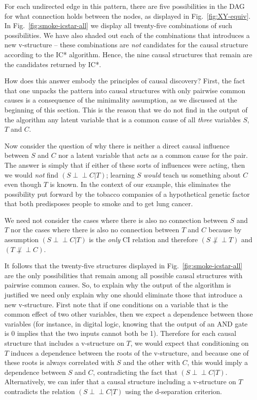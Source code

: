 \documentclass[letterpaper,onecolumn,nofootinbib]{revtex4}
\def\indep{\perp\!\!\!\!\perp}
\begin{document}
For each undirected edge in this pattern, there are five possibilities in the DAG for what connection holds between the nodes, as displayed in Fig.~\ref{fig:XY-equiv}. In Fig.~\ref{fig:smoke-icstar-all} we display all twenty-five combinations of such possibilities.  We have also shaded out each of the combinations that introduces a new v-structure -- these combinations are \emph{not} candidates for the causal structure according to the IC* algorithm.  Hence, the nine causal structures that remain are the candidates returned by IC*.

How does this answer embody the principles of causal discovery?  
First, the fact that one unpacks the pattern into causal structures with only pairwise common causes is a consequence of the minimality assumption, 
as we discussed at the beginning of this section.  This is the reason that we do not find in the output of the algorithm any latent variable that is a common cause of all \emph{three} variables $S$, $T$ and $C$.

Now consider the question of why there is neither a direct causal influence between $S$ and $C$ nor a latent variable that acts as a common cause for the pair.  The  answer is simply that if either of these sorts of influences were acting, then we would \emph{not} find $(S \indep C |T)$; learning $S$ \emph{would} teach us something about $C$ even though $T$ is known. In the context of our example, this eliminates the possibility put forward by the tobacco companies of a hypothetical genetic factor that both predisposes people to smoke and to get lung cancer.

We need not consider the cases where there is also no connection between $S$ and $T$ nor the cases where there is also no connection between $T$ and $C$ because by assumption $(S \indep C|T)$ is the \emph{only} CI relation and therefore $(S \not\indep T)$ and $(T \not\indep C)$.

It follows that the twenty-five structures displayed in Fig.~\ref{fig:smoke-icstar-all} are the only possibilities that remain among all possible causal structures with pairwise common causes.  So, to explain why the output of the algorithm is justified we need only explain why one should eliminate those that introduce a new v-structure.
First note that if one conditions on a variable that is the common effect of two other variables, then we expect a dependence between those variables (for instance, in digital logic, knowing that the output of an AND gate is 0 implies that the two inputs cannot both be 1). Therefore for each causal structure that includes a v-structure on $T$, we would expect that conditioning on $T$ induces a dependence between the roots of the v-structure, and because one of these roots is always correlated with $S$ and the other with $C$, this would imply a dependence between $S$ and $C$, contradicting the fact that $(S \indep C|T)$.  Alternatively, we can infer that a causal structure including a v-structure on $T$ contradicts the relation $(S \indep C|T)$ using the d-separation criterion.
\end{document}
